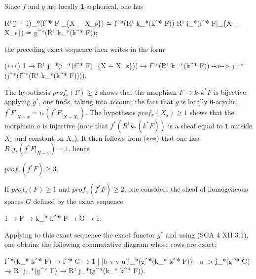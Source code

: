 \documentclass[
]{article}
\newenvironment{Shaded}{}{}
\newcommand{\NormalTok}[1]{#1}
\begin{document}
Since \(f\) and \(g\) are locally \texttt{1}-aspherical, one has

\begin{Shaded}
\begin{Highlighting}[]
\NormalTok{R¹(j · i)\_*(f\^{}* F|\_\{X − X\_s\}) ≃ f\^{}*(R¹ k\_*(k\^{}* F))}
\NormalTok{R¹ i\_*(f\^{}* F|\_\{X − X\_s\}) ≃ g\^{}*(R¹ k\_*(k\^{}* F));}
\end{Highlighting}
\end{Shaded}

the preceding exact sequence then writes in the form

\begin{Shaded}
\begin{Highlighting}[]
\NormalTok{(∗∗∗)  1 → R¹ j\_*(i\_*(f\^{}* F|\_\{X − X\_s\})) → f\^{}*(R¹ k\_*(k\^{}* F)) {-}{-}a{-}{-}\textgreater{} j\_*(j\^{}*(f\^{}*(R¹ k\_*(k\^{}* F)))).}
\end{Highlighting}
\end{Shaded}

The hypothesis \(prof_{s}(F) \geqslant 2\) shows that the morphism
\(F \to k_{*} k^{*} F\) is bijective; applying \(g^{*}\), one finds,
taking into account the fact that \(g\) is locally \texttt{0}-acyclic,
\(f^{*} F|_{X - {x}} = i_{*}(f^{*} F|_{X - X_{s}})\). The hypothesis
\(prof_{x}(X_{s}) \geqslant 1\) shows that the morphism \(a\) is
injective (note that \(f^{*}(R^{1} k_{*}(k^{*} F))\) is a sheaf equal to
\texttt{1} outside \(X_{s}\) and constant on \(X_{s}\)). It then follows
from (∗∗∗) that one has \(R^{1} j_{*}(f^{*} F|_{X - {x}}) = 1\), hence

\(prof_{x}(f^{*} F) \geqslant 3\).

If \(prof_{s}(F) \geqslant 1\) and \(prof_{x}(f^{*} F) \geqslant 2\),
one considers the sheaf of homogeneous spaces \(G\) defined by the exact
sequence

\begin{Shaded}
\begin{Highlighting}[]
\NormalTok{1 → F → k\_* k\^{}* F → G → 1.}
\end{Highlighting}
\end{Shaded}

Applying to this exact sequence the exact functor \(g^{*}\) and using
(SGA 4 XII 3.1), one obtains the following commutative diagram whose
rows are exact:

\begin{Shaded}
\begin{Highlighting}[]
\NormalTok{f\^{}*(k\_* k\^{}* F)       →     f\^{}* G                   → 1}
\NormalTok{        |                    |b}
\NormalTok{        v                    v u}
\NormalTok{j\_*(g\^{}*(k\_* k\^{}* F)) {-}{-}u{-}{-}\textgreater{}  j\_*(g\^{}* G)      → R¹ j\_*(g\^{}* F) → R¹ j\_*(g\^{}*(k\_* k\^{}* F)).}
\end{Highlighting}
\end{Shaded}
\end{document}
